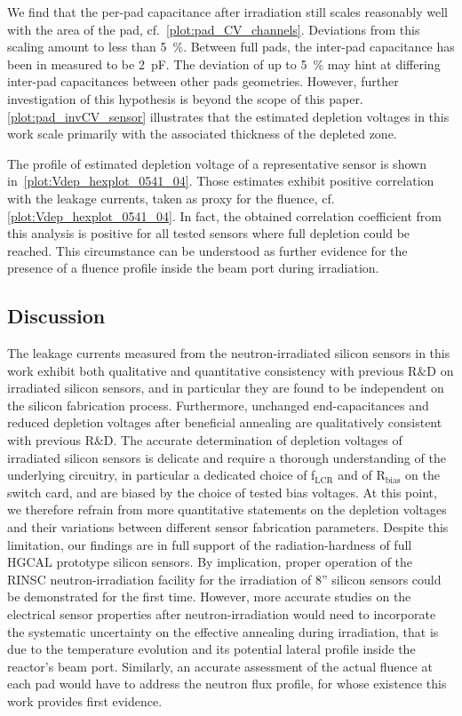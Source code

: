 We find that the per-pad capacitance after irradiation still scales reasonably well with the area of the pad, cf.~\ref{plot:pad_CV_channels}.
Deviations from this scaling amount to less than \SI{5}{\percent}.
Between full pads, the inter-pad capacitance has been in measured to be \SI{2}{\pico\farad}.
The deviation of up to \SI{5}{\percent} may hint at differing inter-pad capacitances between other pads geometries.
However, further investigation of this hypothesis is beyond the scope of this paper. 
\ref{plot:pad_invCV_sensor} illustrates that the estimated depletion voltages in this work scale primarily with the associated thickness of the depleted zone. 

The profile of estimated depletion voltage of a representative sensor is shown in~\ref{plot:Vdep_hexplot_0541_04}.
Those estimates exhibit positive correlation with the leakage currents, taken as proxy for the fluence, cf. \ref{plot:Vdep_hexplot_0541_04}.
In fact, the obtained correlation coefficient from this analysis is positive for all tested sensors where full depletion could be reached.
This circumstance can be understood as further evidence for the presence of a fluence profile inside the beam port during irradiation.

\subsection{Discussion}
\label{subsec:discussion}
The leakage currents measured from the neutron-irradiated silicon sensors in this work exhibit both qualitative and quantitative consistency with previous R$\&$D on irradiated silicon sensors, and in particular they are found to be independent on the silicon fabrication process.
Furthermore, unchanged end-capacitances and reduced depletion voltages after beneficial annealing are qualitatively consistent with previous R$\&$D.
The accurate determination of depletion voltages of irradiated silicon sensors is delicate and require a thorough understanding of the underlying circuitry, in particular a dedicated choice of f$_\text{LCR}$ and of R$_\text{bias}$ on the switch card, and are biased by the choice of tested bias voltages.
At this point, we therefore refrain from more quantitative statements on the depletion voltages and their variations between different sensor fabrication parameters.\newline
Despite this limitation, our findings are in full support of the radiation-hardness of full HGCAL prototype silicon sensors.
By implication, proper operation of the RINSC neutron-irradiation facility for the irradiation of 8'' silicon sensors could be demonstrated for the first time.
However, more accurate studies on the electrical sensor properties after neutron-irradiation would need to incorporate the systematic uncertainty on the effective annealing during irradiation, that is due to the temperature evolution and its potential lateral profile inside the reactor's beam port.
Similarly, an accurate assessment of the actual fluence at each pad would have to address the neutron flux profile, for whose existence this work provides first evidence.